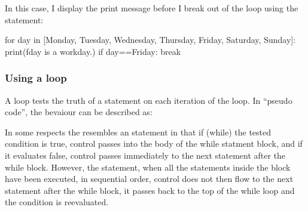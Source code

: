 \documentclass[letterpaper,10pt,english]{sphinxmanual}
\begin{document}
In this case, I display the print message before I break out of the loop using the  statement:

{
\begin{sphinxVerbatim}[commandchars=\\\{\}]
\llap{\color{nbsphinxin}[ ]:\,\hspace{\fboxrule}\hspace{\fboxsep}}for day in [\PYGZsq{}Monday\PYGZsq{}, \PYGZsq{}Tuesday\PYGZsq{}, \PYGZsq{}Wednesday\PYGZsq{},
            \PYGZsq{}Thursday\PYGZsq{}, \PYGZsq{}Friday\PYGZsq{}, \PYGZsq{}Saturday\PYGZsq{}, \PYGZsq{}Sunday\PYGZsq{}]:
    print(f\PYGZdq{}\PYGZob{}day\PYGZcb{} is a workday.\PYGZdq{})
    if day==\PYGZsq{}Friday\PYGZsq{}:
        break
\end{sphinxVerbatim}
}


\subsubsection{Using a  loop}
\label{\detokenize{content/02_Robot_Lab/Section_00_01:Using-a-while...-loop}}
A  loop tests the truth of a statement on each iteration of the loop. In “pseudo code”, the bevaiour can be described as:

\begin{sphinxVerbatim}[commandchars=\\\{\}]
         


  

  

  

  

  


\end{sphinxVerbatim}

In some respects the  resembles an  statement in that if (while) the tested condition is true, control passes into the body of the while statment block, and if it evaluates false, control passes immediately to the next statement after the while block. However,  the  statement, when all the statements inside the  block have been executed, in sequential order, control does not then flow to the next statement after the while block, it passes back to the top of
the while loop and the condition is re\sphinxhyphen{}evaluated.
\end{document}
